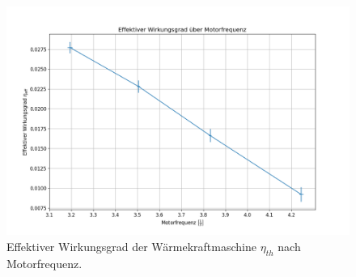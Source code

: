 \begin{figure}[H]
    \centering
    \includegraphics[width=.9\textwidth]{files/eta_eff_freq.png}
    \caption{Effektiver Wirkungsgrad der Wärmekraftmaschine $\eta_{th}$ nach Motorfrequenz.}
    \label{fig:eta_eff_freq}
\end{figure}